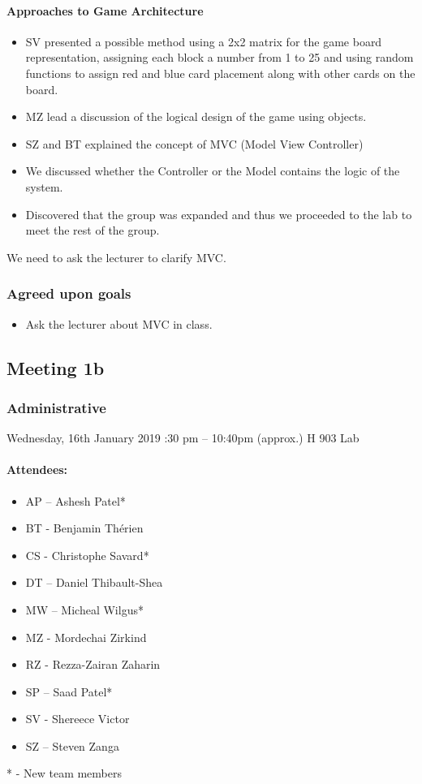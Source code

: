 \documentclass[10pt, a4paper]{article}
\begin{document}
			\paragraph{Approaches to Game Architecture  }
			\begin{itemize}
				\item SV presented a possible method using a 2x2 matrix for the game board representation, assigning each block a number from 1 to 25 and using random functions to assign red and blue card placement along with other cards on the board. 
				\item MZ lead a discussion of the logical design of the game using objects.
				\item SZ and BT explained the concept of MVC (Model View Controller)
				\item We discussed whether the Controller or the Model contains the logic of the system.
				\item Discovered that the group was expanded and thus we proceeded to the lab to meet the rest of the group. 
			\end{itemize}
			We need to ask the lecturer to clarify MVC. 
			
			\subsubsection{Agreed upon goals}
			\begin{itemize}
				\item Ask the lecturer about MVC in class. 
			\end{itemize}
			
			\pagebreak
			
			\subsection{Meeting 1b}
			
			\subsubsection{Administrative}
			Wednesday, 16th January 2019 :30 pm – 10:40pm (approx.) \textbar H 903 Lab
			\paragraph{Attendees:} 
			\begin{itemize}
				\item AP – Ashesh Patel*
				\item BT - Benjamin Th\'erien
				\item CS - Christophe Savard*
				\item DT – Daniel Thibault-Shea
				\item MW – Micheal Wilgus*  
				\item MZ - Mordechai Zirkind 
				\item RZ - Rezza-Zairan Zaharin
				\item SP – Saad Patel* 	
				\item SV - Shereece Victor
				\item SZ – Steven Zanga
			\end{itemize}
			* - New team members 
			
\end{document}
